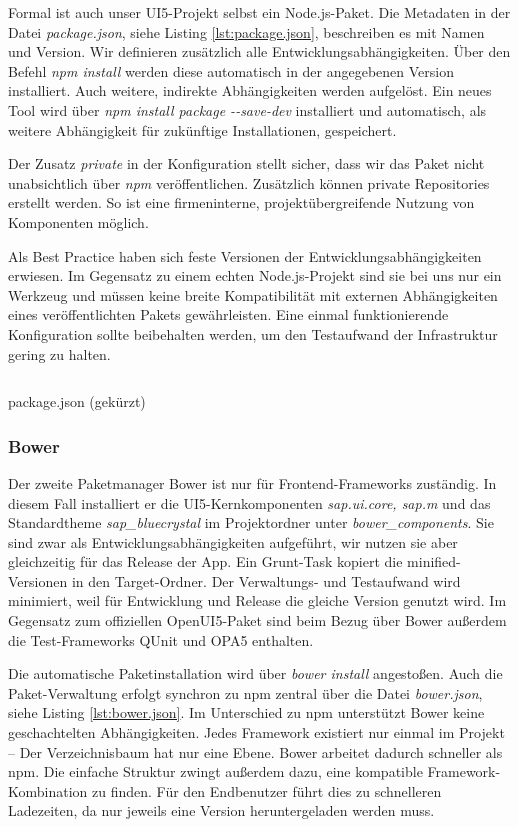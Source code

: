 Formal ist auch unser UI5-Projekt selbst ein Node.js-Paket. Die Metadaten in der Datei \textit{package.json}, siehe Listing \ref{lst:package.json}, beschreiben es mit Namen und Version. Wir definieren zusätzlich alle Entwicklungsabhängigkeiten. Über den Befehl \textit{npm install} werden diese automatisch in der angegebenen Version installiert. Auch weitere, indirekte Abhängigkeiten werden aufgelöst. Ein neues Tool wird über \textit{npm install package -{}-save-dev} installiert und automatisch, als weitere Abhängigkeit für zukünftige Installationen, gespeichert.

Der Zusatz \textit{private} in der Konfiguration stellt sicher, dass wir das Paket nicht unabsichtlich über \textit{npm} veröffentlichen. Zusätzlich können private Repositories erstellt werden. So ist \zB eine firmeninterne, projektübergreifende Nutzung von Komponenten möglich.

Als Best Practice haben sich feste Versionen der Entwicklungsabhängigkeiten erwiesen. Im Gegensatz zu einem echten Node.js-Projekt sind sie bei uns nur ein Werkzeug und müssen keine breite Kompatibilität mit externen Abhängigkeiten eines veröffentlichten Pakets gewährleisten. Eine einmal funktionierende Konfiguration sollte beibehalten werden, um den Testaufwand der Infrastruktur gering zu halten.

\begin{listing}[H]
	\inputminted{json}{src/package.json}
	\caption{package.json (gekürzt)}
	\label{lst:package.json}
\end{listing}

\subsubsection{Bower}
Der zweite Paketmanager Bower ist nur für Frontend-Frameworks zuständig. In diesem Fall installiert er die UI5-Kernkomponenten \textit{sap.ui.core, sap.m} und das Standardtheme \textit{sap\_bluecrystal} im Projektordner unter \textit{bower\_\-components}. Sie sind zwar als Entwicklungsabhängigkeiten aufgeführt, wir nutzen sie aber gleichzeitig für das Release der App. Ein Grunt-Task kopiert die minified-Versionen in den Target-Ordner. Der Verwaltungs- und Testaufwand wird minimiert, weil für Entwicklung und Release die gleiche Version genutzt wird. Im Gegensatz zum offiziellen OpenUI5-Paket sind beim Bezug über Bower außerdem die Test-Frameworks QUnit und OPA5 enthalten.

Die automatische Paketinstallation wird über \textit{bower install} angestoßen. Auch die Paket-Verwaltung erfolgt synchron zu npm zentral über die Datei \textit{bower.json}, siehe Listing \ref{lst:bower.json}.
Im Unterschied zu npm unterstützt Bower keine geschachtelten Abhängigkeiten. Jedes Framework existiert nur einmal im Projekt -- Der Verzeichnisbaum hat nur eine Ebene. Bower arbeitet dadurch schneller als npm. 
Die einfache Struktur zwingt außerdem dazu, eine kompatible Framework-Kombination zu finden. Für den Endbenutzer führt dies zu schnelleren Ladezeiten, da nur jeweils eine Version heruntergeladen werden muss.

